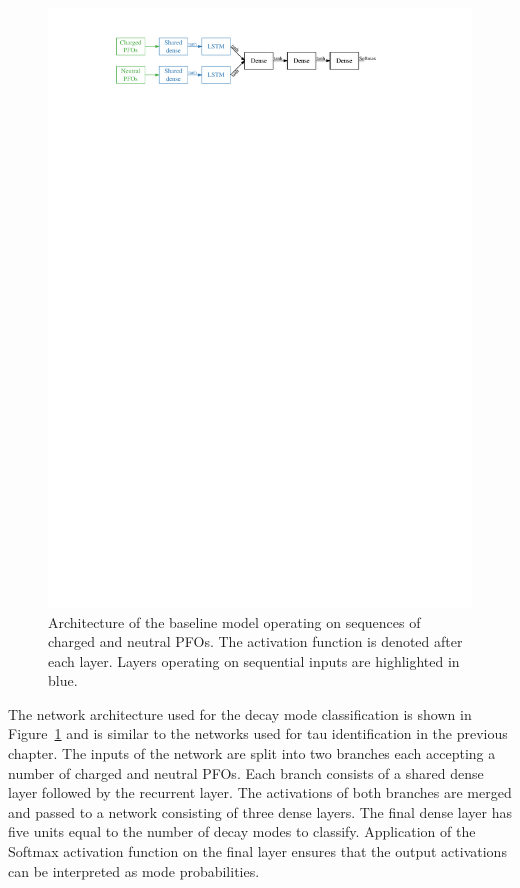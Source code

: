 \begin{figure}[htb]
  \centering
  \includegraphics{./figures/decay_mode_classification/baseline_architecture.pdf}
  \caption{Architecture of the baseline model operating on sequences of charged
    and neutral PFOs. The activation function is denoted after each layer.
    Layers operating on sequential inputs are highlighted in blue.}
  \label{fig:pfo_rnn_baseline_arch}
\end{figure}

The network architecture used for the decay mode classification is shown in
Figure~\ref{fig:pfo_rnn_baseline_arch} and is similar to the networks used for
tau identification in the previous chapter. The inputs of the network are split
into two branches each accepting a number of charged and neutral PFOs. Each
branch consists of a shared dense layer followed by the recurrent layer. The
activations of both branches are merged and passed to a network consisting of
three dense layers. The final dense layer has five units equal to the number of
decay modes to classify. Application of the Softmax activation function on the
final layer ensures that the output activations can be interpreted as mode
probabilities.

